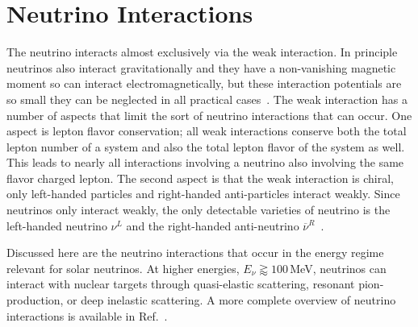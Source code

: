 \section{Neutrino Interactions}
\label{sec:neutrino_interactions}
The neutrino interacts almost exclusively via the weak interaction.
In principle neutrinos also interact gravitationally and they have a non-vanishing
magnetic moment so can interact electromagnetically, but these
interaction potentials are so small they can be neglected in all practical
cases~\citep{neutrino_magmom}.
The weak interaction has a number of aspects that limit the sort of neutrino
interactions that can occur. One aspect is lepton flavor conservation;
all weak interactions conserve both the total lepton number of a system and also
the total lepton flavor of the system as well.
This leads to nearly all interactions involving a neutrino also involving the
same flavor charged lepton.
The second aspect is that the weak interaction is chiral,
only left-handed particles and right-handed anti-particles interact weakly.
Since neutrinos only interact weakly, the only detectable varieties of neutrino
is the left-handed neutrino $\nu^{L}$  and the right-handed
anti-neutrino $\overline{\nu}^{R}$~\citep{weinberg}.

Discussed here are the neutrino interactions that occur in the energy regime
relevant for solar neutrinos.
At higher energies, $E_{\nu} \gtrapprox 100$\,MeV, neutrinos can interact
with nuclear targets through quasi-elastic scattering, resonant
pion-production, or deep inelastic scattering.
A more complete overview of neutrino interactions is available in Ref.~\citep{neutrino_xsec}.



